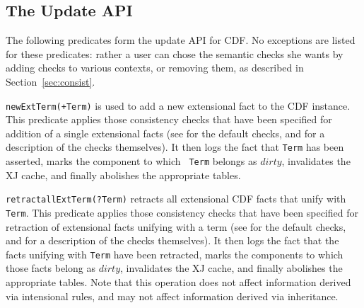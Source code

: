 
\subsection{The Update API}

The following predicates form the update API for CDF.  No exceptions
are listed for these predicates: rather a user can chose the semantic
checks she wants by adding checks to various contexts, or removing
them, as described in Section~\ref{sec:consist}.

\begin{description}

{\tt newExtTerm(+Term)} is used to add a new extensional fact to the
CDF instance.  This predicate applies those consistency checks that
have been specified for addition of a single extensional facts (see
 for the default checks, and 
for a description of the checks themselves).  It then logs the fact
that {\tt Term} has been asserted, marks the component to which {\tt
Term} belongs as $dirty$, invalidates the XJ cache, and finally
abolishes the appropriate tables.


{\tt retractallExtTerm(?Term)} retracts all extensional CDF facts that
unify with {\tt Term}.  This predicate applies those consistency
checks that have been specified for retraction of extensional facts
unifying with a term (see  for the default checks,
and  for a description of the checks themselves).
It then logs the fact that the facts unifying with {\tt Term} have
been retracted, marks the components to which those facts belong as
$dirty$, invalidates the XJ cache, and finally abolishes the
appropriate tables.  Note that this operation does not affect
information derived via intensional rules, and may not affect
information derived via inheritance.




\end{description}
